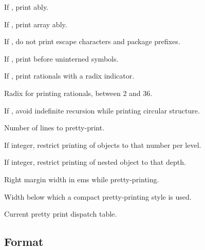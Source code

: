 \begin{LIST}{1cm}
  If \T, print ably.

  If \T, print array ably.

  If \NIL, do not print escape characters and package prefixes.

  If \T, print \kwd{:\#} before uninterned symbols.

  If \T, print rationals with a radix indicator.

  Radix for printing rationals, between 2 and 36.

  If \T, avoid indefinite recursion while printing circular
  structure. 

  Number of lines to pretty-print.

  If integer, restrict printing of objects to that number per level.

  If integer, restrict printing of nested object to that depth.

  Right margin width in ems while pretty-printing.

  Width below which a compact pretty-printing style is used.

  Current pretty print dispatch table.

\end{LIST}



\subsection{Format}
\label{section:Format}

